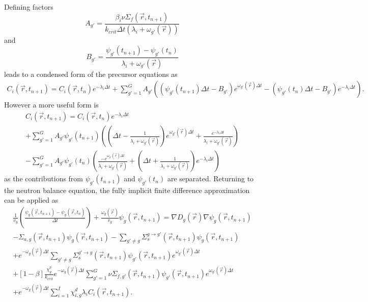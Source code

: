 \documentclass[12pt]{report}
\begin{document}
	Defining factors
	\begin{equation}
	A_{g'} = \frac{\beta_i \nu\Sigma_f(\vec{r},t_{n+1})}{k_{crit} \Delta t \left(\lambda_i + \omega_{g'}(\vec{r})\right)}
	\end{equation}
	and
	\begin{equation}
	B_{g'} = \frac{\psi_{g'}(t_{n+1})-\psi_{g'}(t_{n})}{\lambda_i + \omega_{g'}(\vec{r})}
	\end{equation}
	leads to a condensed form of the precursor equations as
	\begin{eqnarray}
	C_i(\vec{r},t_{n+1}) =  C_i(\vec{r},t_{n}) e^{-\lambda_i \Delta t} +  \sum_{g'=1}^{G} A_{g'} \left( \left( \psi_{g'}(t_{n+1}) \Delta t - B_{g'} \right) e^{ \omega_{g'}(\vec{r}) \Delta t} - 
	\left( \psi_{g'}(t_n) \Delta t - B_{g'} \right) e^{-\lambda_i \Delta t} \right) \nonumber.
	\end{eqnarray}
	However a more useful form is
	\begin{eqnarray}
	C_i(\vec{r},t_{n+1}) =  C_i(\vec{r},t_{n}) e^{-\lambda_i \Delta t} \nonumber \\ 
	+ \sum_{g'=1}^{G} A_{g'} \psi_{g'}(t_{n+1}) \left( \left( \Delta t - \frac{1}{\lambda_i + \omega_{g'}(\vec{r})} \right) e^{\omega_{g'}(\vec{r}) \Delta t} + \frac{e^{-\lambda_i \Delta t}}{\lambda_i + \omega_{g'}(\vec{r})} \right) \nonumber \\
	- \sum_{g'=1}^{G} A_{g'} \psi_{g'}(t_{n}) \left( \frac{-e^{\omega_{g'}(\vec{r}) \Delta t}}{\lambda_i + \omega_{g'}(\vec{r})} + \left(\Delta t + \frac{1}{\lambda_i + \omega_{g'}(\vec{r})} \right)e^{-\lambda_i \Delta t} \right) \nonumber
	\end{eqnarray}
	as the contributions from $\psi_{g'}(t_{n+1})$ and $\psi_{g'}(t_{n})$ are separated. Returning to the neutron balance equation, the fully implicit finite difference approximation can be applied as
	\begin{eqnarray}
		 \frac{1}{v_g} \left(\frac{\psi_g(\vec{r},t_{n+1}) - \psi_g(\vec{r},t_{n})}{\Delta t} \right) + \frac{\omega_g(\vec{r})}{v_g} \psi_g(\vec{r},t_{n+1})  = \nabla D_g(\vec{r}) \nabla \psi_g(\vec{r},t_{n+1}) \nonumber \\ - \Sigma_{a,g}(\vec{r},t_{n+1}) \psi_g(\vec{r},t_{n+1}) - \sum_{g'\neq g} \Sigma_{s}^{g\rightarrow g'} (\vec{r},t_{n+1}) \psi_g(\vec{r},t_{n+1}) \nonumber \\ + e^{-\omega_g(\vec{r}) \Delta t} \sum_{g' \neq g} \Sigma_{s}^{g'\rightarrow g} (\vec{r},t_{n+1}) \psi_{g'}(\vec{r},t_{n+1}) e^{\omega_{g'}(\vec{r}) \Delta t} \nonumber \\
		+ \left[ 1- \beta \right] \frac{\chi_g^p}{k_{crit}} e^{-\omega_g(\vec{r}) \Delta t} \sum_{g'=1}^{G} \nu \Sigma_{f,g'}(\vec{r},t_{n+1}) \psi_{g'}(\vec{r},t_{n+1}) e^{\omega_{g'}(\vec{r}) \Delta t} \nonumber \\ + e^{-\omega_g(\vec{r}) \Delta t} \sum_{i=1}^{I} \chi_{i,g}^d \lambda_i C_i(\vec{r},t_{n+1}) \nonumber.
	\end{eqnarray}
\end{document}
